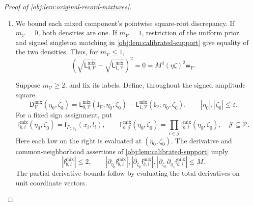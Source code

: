\documentclass[11pt]{article}
\begin{document}
\begin{proof}[Proof of \cref{obj:lem:original-record-mixtures}]
\begin{enumerate}
Define the conditional discrepancy by
\[
\mathsf h_{\mathrm{mix}}(\mathbf x)
=
\int_{\mathscr L^{\mathcal I_n}}
\left(
\sqrt{\mathsf L_0^{\mathrm{mix}}(\mathbf x,\boldsymbol l;\eta,\zeta)}
-\sqrt{\mathsf L_1^{\mathrm{mix}}(\mathbf x,\boldsymbol l;\eta,\zeta)}
\right)^2\,d\tau^{\otimes n}(\boldsymbol l).
\]
Since each label vector has reference mass \(4^{-n}\), scaling the
densities by \(4^{-n}\) turns this integral exactly into the squared
root discrepancy of the corresponding label masses. The affinity
calculation therefore proves
\[
\mathsf h_{\mathrm{mix}}(\mathbf x)
\le
\sum_{\mathcal V\in\mathscr B_{\mathbf x}}
4^{-m_{\mathcal V}}
\sum_{\boldsymbol l_{\mathcal V}\in\mathscr L^{\mathcal V}}
\left(
\sqrt{\mathsf L_{0,\mathcal V}^{\mathrm{mix}}}
-\sqrt{\mathsf L_{1,\mathcal V}^{\mathrm{mix}}}
\right)^2.
\]
Finally, the common uniform covariate marginal and the displayed
product densities give, by integration over covariates and labels,
\[
\mathcal H^2(Q_0,Q_1)
=\int\mathsf h_{\mathrm{mix}}(\mathbf x)\,
d\lambda^{\otimes n}(\mathbf x).
\]

\item We bound each mixed component's pointwise square-root discrepancy.
If \(m_{\mathcal V}=0\), both densities are one. If
\(m_{\mathcal V}=1\), restriction of the uniform prior and signed
singleton matching in \cref{obj:lem:calibrated-support} give equality
of the two densities. Thus, for \(m_{\mathcal V}\le1\),
\[
\left(
\sqrt{\mathsf L_{0,\mathcal V}^{\mathrm{mix}}}
-\sqrt{\mathsf L_{1,\mathcal V}^{\mathrm{mix}}}
\right)^2=0=M^4(\eta\zeta)^2\mathsf w_{\mathcal V}.
\]

Suppose \(m_{\mathcal V}\ge2\), and fix its labels. Define, throughout
the signed amplitude square,
\[
\mathsf D_{\mathcal V}^{\mathrm{mix}}(\eta_0,\zeta_0)
=
\mathsf L_{0,\mathcal V}^{\mathrm{mix}}
(\boldsymbol l_{\mathcal V};\eta_0,\zeta_0)
-
\mathsf L_{1,\mathcal V}^{\mathrm{mix}}
(\boldsymbol l_{\mathcal V};\eta_0,\zeta_0),
\qquad
|\eta_0|,|\zeta_0|\le\varepsilon.
\]
For a fixed sign assignment, put
\[
\mathsf f_{b,i}^{\mathrm{mix}}(\eta_0,\zeta_0)
=\mathsf f_{P_{b,\widehat\sigma_{\mathcal V}}}(x_i,l_i),
\qquad
\mathsf F_{b,\mathcal J}^{\mathrm{mix}}(\eta_0,\zeta_0)
=\prod_{i\in\mathcal J}\mathsf f_{b,i}^{\mathrm{mix}}(\eta_0,\zeta_0),
\quad \mathcal J\subseteq\mathcal V.
\]
Here each law on the right is evaluated at \((\eta_0,\zeta_0)\).
The derivative and common-neighborhood assertions of
\cref{obj:lem:calibrated-support} imply
\[
|\mathsf f_{b,i}^{\mathrm{mix}}|\le2,\qquad
|\partial_{\eta_0}\mathsf f_{b,i}^{\mathrm{mix}}|,
|\partial_{\zeta_0}\mathsf f_{b,i}^{\mathrm{mix}}|,
|\partial_{\zeta_0}\partial_{\eta_0}\mathsf f_{b,i}^{\mathrm{mix}}|
\le M.
\]
The partial derivative bounds follow by evaluating the total
derivatives on unit coordinate vectors.


\end{enumerate}
\end{proof}
\end{document}
